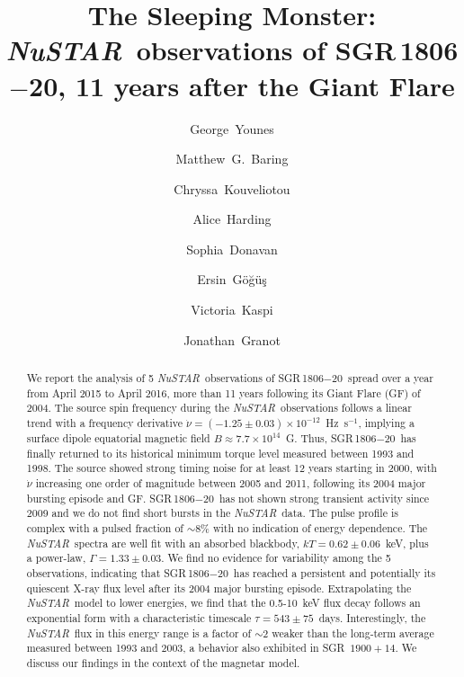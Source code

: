 \documentclass[twocolumn]{aastex6}
\newcommand {\nustar} {\textsl{NuSTAR}}
\def \src {SGR\,1806$-$20}
\begin{document}
\title{The Sleeping Monster: \nustar\ observations of \src, 11 years after the Giant Flare}

%
\author{George~Younes}
\author{Matthew~G.~Baring}
\author{Chryssa~Kouveliotou}
\author{Alice~Harding}
\author{Sophia~Donavan}
\author{Ersin~G\"o\u{g}\"u\c{s}}
\author{Victoria~Kaspi}
\author{Jonathan~Granot}


\begin{abstract}

We report the analysis of 5 \nustar\ observations of \src\ spread over a year from April 2015 to April 2016, more than 11 years following its Giant Flare (GF) of 2004. The source spin frequency during the \nustar\ observations follows a linear trend with a frequency derivative $\dot{\nu}=(-1.25\pm0.03)\times10^{-12}$~Hz~s$^{-1}$, implying a surface dipole equatorial magnetic field $B\approx7.7\times10^{14}$~G.  Thus, \src\ has finally returned to its historical minimum torque level measured between 1993 and 1998. The source showed strong timing noise for at least 12 years starting in 2000, with $\dot{\nu}$ increasing one order of magnitude between 2005 and 2011, following its 2004 major bursting episode and GF. \src\ has not shown strong transient activity since 2009 and we do not find short bursts in the \nustar\ data. The pulse profile is complex with a pulsed fraction of $\sim8\%$ with no indication of energy dependence. The \nustar\ spectra are well fit with an absorbed blackbody, $kT=0.62\pm0.06$~keV, plus a power-law, $\Gamma=1.33\pm0.03$. We find no evidence for variability among the 5 observations, indicating that \src\ has reached a persistent and potentially its quiescent X-ray flux level after its 2004 major bursting episode. Extrapolating the \nustar\ model to lower energies, we find that the 0.5-10~keV flux decay follows an exponential form with a characteristic timescale $\tau=543\pm75$~days. Interestingly, the \nustar\ flux in this energy range is a factor of $\sim2$ weaker than the long-term average measured between 1993 and 2003, a behavior also exhibited in SGR~$1900+14$. We discuss our findings in the context of the magnetar model.

\end{abstract}
\end{document}
